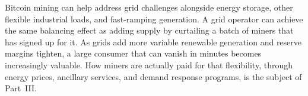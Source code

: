 Bitcoin mining can help address grid challenges alongside energy storage, other flexible industrial loads, and fast-ramping generation. A grid operator can achieve the same balancing effect as adding supply by curtailing a batch of miners that has signed up for it. As grids add more variable renewable generation and reserve margins tighten, a large consumer that can vanish in minutes becomes increasingly valuable. How miners are actually paid for that flexibility, through energy prices, ancillary services, and demand response programs, is the subject of Part~III.
